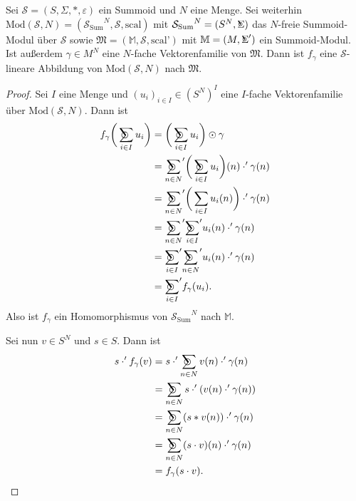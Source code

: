 \documentclass{article}
\DeclareMathOperator*{\Sigmacirc}{%
  \ThisStyle{\mathop{\ensurestackMath{\stackinset{c}{-0.75\LMpt}{c}{}{%
  \rotatebox[origin=lb]{-90}{$\circ$}}{\SavedStyle\Sigma}}}}}
\DeclareMathOperator*{\sumcirc}{%
  \ThisStyle{\mathop{\ensurestackMath{\stackinset{c}{-1.5\LMpt}{c}{}{%
  \rotatebox[origin=lb]{-90}{$\SavedStyle\scalerel*{\bm\Circle}{%
  i}$}}{\SavedStyle\sum}}}}}
\begin{document}
\begin{theorem}\label{Theorem_FGammaSLinear}
  Sei $\mathcal{S} = (S, \Sigma, \ast, \varepsilon)$ ein Summoid und $N$ eine Menge.
  Sei weiterhin $\text{Mod}(\mathcal{S}, N) = ({\mathcal{S}_\text{Sum}}^N, \mathcal{S}, \text{scal})$
  mit ${\mathcal{S}_\text{Sum}}^N = (S^N, \Sigmacirc)$ das $N$-freie Summoid-Modul über $\mathcal{S}$
  sowie $\mathfrak{M} = (\mathbb{M}, \mathcal{S}, \text{scal'})$
  mit $\mathbb{M} = (M, \Sigmacirc')$ ein Summoid-Modul.
  Ist außerdem $\gamma \in M^N$ eine $N$-fache Vektorenfamilie von $\mathfrak{M}$.
  Dann ist $f_\gamma$ eine $\mathcal{S}$-lineare Abbildung von $\text{Mod}(\mathcal{S}, N)$ nach $\mathfrak{M}$.
\end{theorem}
\begin{proof}
  Sei $I$ eine Menge und $(u_i)_{i \in I} \in (S^N)^I$ eine $I$-fache Vektorenfamilie über $\text{Mod}(\mathcal{S}, N)$.
  Dann ist
  \begin{align*}
    f_\gamma\bigg(\sumcirc_{i \in I} u_i\bigg)
    &= \bigg(\sumcirc_{i \in I} u_i\bigg) \odot \gamma \\
    &= {\sumcirc_{n \in N}}' \bigg(\sumcirc_{i \in I} u_i\bigg)(n) \cdot' \gamma(n) \\
    &= {\sumcirc_{n \in N}}' \bigg(\sum_{i \in I} u_i(n)\bigg) \cdot' \gamma(n) \\
    &= {\sumcirc_{n \in N}}' {\sumcirc_{i \in I}}' u_i(n) \cdot' \gamma(n) \\
    &= {\sumcirc_{i \in I}}' {\sumcirc_{n \in N}}' u_i(n) \cdot' \gamma(n) \\
    &= {\sumcirc_{i \in I}}' f_\gamma(u_i).
  \end{align*}
  Also ist $f_\gamma$ ein Homomorphismus von ${\mathcal{S}_\text{Sum}}^N$ nach $\mathbb{M}$.

  Sei nun $v \in S^N$ und $s \in S$.
  Dann ist
  \begin{align*}
    s \cdot ' f_\gamma(v)
    &= s \cdot' \sumcirc_{n \in N} v(n) \cdot' \gamma(n) \\
    &= \sumcirc_{n \in N} s \cdot' (v(n) \cdot' \gamma(n)) \\
    &= \sumcirc_{n \in N} (s \ast v(n)) \cdot' \gamma(n) \\
    &= \sumcirc_{n \in N} (s \cdot v)(n) \cdot' \gamma(n) \\
    &= f_\gamma(s \cdot v).
  \end{align*}
\end{proof}
\end{document}
